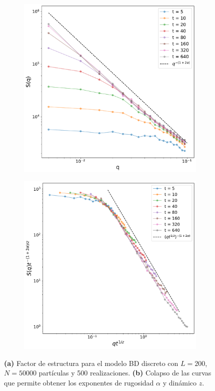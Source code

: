 \begin{figure}[!t]
    \hspace*{-1cm}
    \begin{subfigure}{.55\textwidth}
      \centering
      \includegraphics[width=\textwidth]{Sq.pdf}
      \caption{}
    \end{subfigure}
    \begin{subfigure}{.55\textwidth}
      \centering
      \includegraphics[width=\textwidth]{Sq_colapse.pdf}
      \caption{}
    \end{subfigure}
    \caption[Factor de estructura del modelo BD discreto.]{\textbf{(a)} Factor de estructura para el modelo BD discreto con $L=200$, $N=50000$ partículas y 500 realizaciones. \textbf{(b)} Colapso de las curvas que permite obtener los exponentes de rugosidad $\alpha$ y dinámico $z$.}
    \label{fig:structure_factor}
\end{figure}

